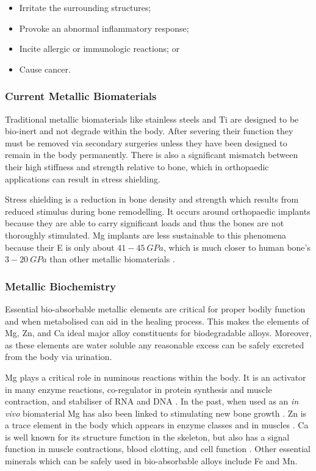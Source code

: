 \documentclass[a4paper,12pt,oneside]{report}%
\begin{document}
\begin{itemize}
	\item Irritate the surrounding structures;
	\item Provoke an abnormal inflammatory response;
	\item Incite allergic or immunologic reactions; or
	\item Cause cancer. 
\end{itemize}

\subsubsection{Current Metallic Biomaterials}
Traditional metallic biomaterials like stainless steels and Ti are designed to be bio-inert and not degrade within the body. After severing their function they must be removed via secondary surgeries unless they have been designed to remain in the body permanently. There is also a significant mismatch between their high stiffness and strength relative to bone, which in orthopaedic applications can result in stress shielding.

Stress shielding is a reduction in bone density and strength which results from reduced stimulus during bone remodelling. It occurs around orthopaedic implants because they are able to carry significant loads and thus the bones are not thoroughly stimulated. Mg implants are less sustainable to this phenomena because their \gls{E} is only about $41 - 45~ GPa$, which is much closer to human bone's $3 - 20~ GPa$ than other metallic biomaterials \cite{Wang2012, Zberg2009}.

\subsubsection{Metallic Biochemistry}
Essential bio-absorbable metallic elements are critical for proper bodily function and when metabolised can aid in the healing process. This makes the elements of Mg, Zn, and Ca ideal major alloy constituents for biodegradable alloys. Moreover, as these elements are water soluble any reasonable excess can be safely excreted from the body via urination.

Mg plays a critical role in numinous reactions within the body. It is an activator in many enzyme reactions, co-regulator in protein synthesis and muscle contraction, and stabiliser of RNA and DNA \cite{Zheng2014} . In the past, when used as an \textit{in vivo} biomaterial Mg has also been linked to stimulating new bone growth \cite{Witte2010}.  Zn is a trace element in the body which appears in enzyme classes and in muscles \cite{Zheng2014}.  Ca is well known for its structure function in the skeleton, but also has a signal function in muscle contractions, blood clotting, and cell function \cite{Zheng2014}. Other essential minerals which can be safely used in bio-absorbable alloys include Fe and Mn.
\end{document}
